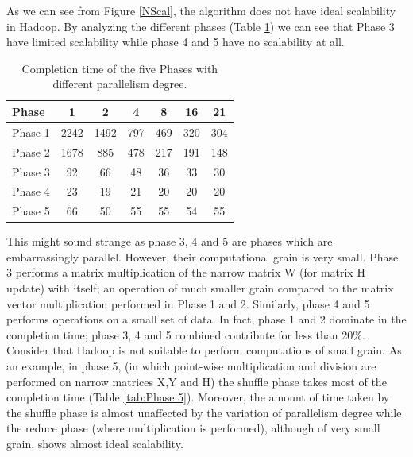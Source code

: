 As we can see from Figure \ref{NScal}, the algorithm does not have ideal scalability in Hadoop.
By analyzing the different phases (Table \ref{tab:differentPhases}) we can see that Phase 3 have limited scalability while phase 4 and 5 have no scalability at all.
\begin{table}[h!]
\begin{center}
\begin{tabular}{ | l || c | c | c | c |  c | c | }

  \hline      
  Phase & 1 & 2 & 4 & 8 &16 & 21 \\
  \hline      
  Phase 1 & 2242 	& 1492 & 797 	& 469 	& 320 	& 304\\
  Phase 2 & 1678 	& 885 	& 478	& 217 	& 191 	& 148\\
  Phase 3 & 92 		& 66 	& 48 	& 36 	& 33 	& 30\\ 
  Phase 4 & 23 		& 19 	& 21 	& 20 	& 20 	& 20\\
  Phase 5 & 66 		& 50 	& 55 	& 55 	& 54 	& 55\\
  \hline  


\end{tabular} 
  \end{center}
  \caption{Completion time of the five Phases with different parallelism degree.}
    \label{tab:differentPhases}
\end{table}
This might sound strange as phase 3, 4 and 5 are phases which are embarrassingly parallel.
However, their computational grain is very small.
Phase 3 performs a matrix multiplication of the narrow matrix W (for matrix H update) with itself; an operation of much smaller grain compared to the matrix vector multiplication performed in Phase 1 and 2. 
Similarly, phase 4 and 5 performs operations on a small set of data.
In fact, phase 1 and 2 dominate in the completion time; phase 3, 4 and 5 combined contribute for less than 20\%.
Consider that Hadoop is not suitable to perform computations of small grain.
As an example, in phase 5, (in which point-wise multiplication and division are performed on narrow matrices X,Y and H)  the shuffle phase takes most of the completion time (Table \ref{tab:Phase 5}). 
Moreover, the amount of time taken by the shuffle phase is almost unaffected by the variation of parallelism degree while the reduce phase (where multiplication is performed), although of very small grain, shows almost ideal scalability.
 

